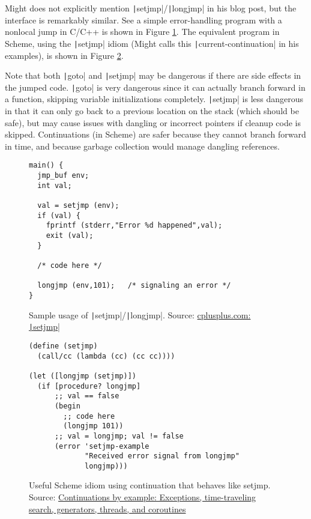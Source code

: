 \documentclass[]{article}
\begin{document}
Might does not explicitly mention \texttt|setjmp|/\texttt|longjmp| in his blog post, but the interface is remarkably similar. See a simple error-handling program with a nonlocal jump in C/C++ is shown in Figure \ref{fig:setj}. The equivalent program in Scheme, using the \texttt|setjmp| idiom (Might calls this \texttt|current-continuation| in his examples), is shown in Figure \ref{fig:idio}.

Note that both \texttt|goto| and \texttt|setjmp| may be dangerous if there are side effects in the jumped code. \texttt|goto| is very dangerous since it can actually branch forward in a function, skipping variable initializations completely. \texttt|setjmp| is less dangerous in that it can only go back to a previous location on the stack (which should be safe), but may cause issues with dangling or incorrect pointers if cleanup code is skipped. Continuations (in Scheme) are safer because they cannot branch forward in time, and because garbage collection would manage dangling references.

\begin{figure}[]
  \centering
\begin{verbatim}
main() {
  jmp_buf env;
  int val;

  val = setjmp (env);
  if (val) {
    fprintf (stderr,"Error %d happened",val);
    exit (val);
  }

  /* code here */

  longjmp (env,101);   /* signaling an error */
}
\end{verbatim}
  \caption{Sample usage of \texttt|setjmp|/\texttt|longjmp|. Source: \href{http://www.cplusplus.com/reference/csetjmp/setjmp/}{cplusplus.com: \texttt|setjmp|}}
  \label{fig:setj}
\end{figure}

\begin{figure}[]
  \centering
\begin{verbatim}
(define (setjmp)
  (call/cc (lambda (cc) (cc cc))))

(let ([longjmp (setjmp)])
  (if [procedure? longjmp]
      ;; val == false
      (begin
        ;; code here
        (longjmp 101))
      ;; val = longjmp; val != false
      (error 'setjmp-example
             "Received error signal from longjmp"
             longjmp)))
\end{verbatim}
  \caption{Useful Scheme idiom using continuation that behaves like setjmp. Source: \href{https://matt.might.net/articles/programming-with-continuations--exceptions-backtracking-search-threads-generators-coroutines/}{Continuations by example: Exceptions, time-traveling search, generators, threads, and coroutines}}
  \label{fig:idio}
\end{figure}
\end{document}
